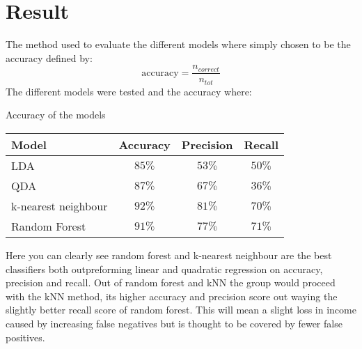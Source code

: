 \section{Result}

The method used to evaluate the different models where simply chosen to be the accuracy defined by:
\begin{equation*}
    \text{accuracy} = \frac{n_{correct}}{n_{tot}}
\end{equation*}
The different models were tested and the accuracy where:
\\
\begin{table*}[h]
    \begin{center}
        Accuracy of the models
        \\
        \begin{tabular}{|l|c|c|c|}
            \hline
            Model & Accuracy & Precision & Recall \\
            \hline
            LDA & $85\%$ & $53\%$ & $50\%$ \\
            QDA & $87\%$ & $67\%$ & $36\%$ \\
            k-nearest neighbour & $92\%$ & $81\%$ & $70\%$ \\
            Random Forest & $91\%$ & $77\%$ &$71\%$ \\
            \hline
        \end{tabular}
    \end{center}
\end{table*}
Here you can clearly see random forest and k-nearest neighbour are the best classifiers both outpreforming linear and quadratic regression on accuracy, precision and recall.
Out of random forest and kNN the group would proceed with the kNN method, its higher accuracy and precision score out waying the slightly better recall score of random forest. 
This will mean a slight loss in income caused by increasing false negatives but is thought to be covered by fewer false positives.
